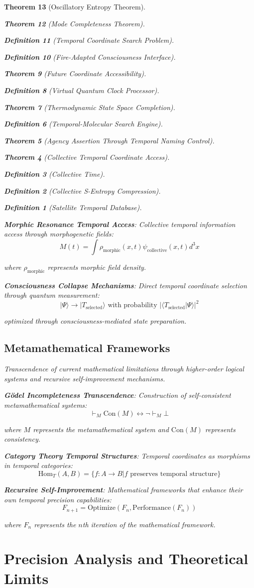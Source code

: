 \documentclass[12pt,a4paper]{article}
\newtheorem{theorem}{Theorem}[section]
\newtheorem{definition}[theorem]{Definition}
\begin{document}
\begin{theorem}[Oscillatory Entropy Theorem]
\begin{theorem}[Mode Completeness Theorem]
\begin{enumerate}
\begin{definition}[Temporal Coordinate Search Problem]
\begin{algorithm}
\begin{definition}[Fire-Adapted Consciousness Interface]
\begin{theorem}[Future Coordinate Accessibility]
\begin{definition}[Virtual Quantum Clock Processor]
\begin{itemize}
\begin{itemize}
\begin{theorem}[Thermodynamic State Space Completion]
\begin{definition}[Temporal-Molecular Search Engine]
\begin{theorem}[Agency Assertion Through Temporal Naming Control]
\begin{remark}
\begin{theorem}[Collective Temporal Coordinate Access]
\begin{definition}[Collective Time]
\begin{definition}[Collective S-Entropy Compression]
\begin{definition}[Satellite Temporal Database]
\begin{algorithm}
\begin{table}[h]
{{\textbf{Morphic Resonance Temporal Access}: Collective temporal information access through morphogenetic fields:
$$M(t) = \int \rho_{\text{morphic}}(x,t) \psi_{\text{collective}}(x,t) d^3x$$

where $\rho_{\text{morphic}}$ represents morphic field density.

\textbf{Consciousness Collapse Mechanisms}: Direct temporal coordinate selection through quantum measurement:
$$|\Psi\rangle \to |T_{\text{selected}}\rangle \text{ with probability } |\langle T_{\text{selected}}|\Psi\rangle|^2$$

optimized through consciousness-mediated state preparation.

\subsection{Metamathematical Frameworks}

Transcendence of current mathematical limitations through higher-order logical systems and recursive self-improvement mechanisms.

\textbf{Gödel Incompleteness Transcendence}: Construction of self-consistent metamathematical systems:
$$\vdash_M \text{Con}(M) \leftrightarrow \neg \vdash_M \bot$$

where $M$ represents the metamathematical system and $\text{Con}(M)$ represents consistency.

\textbf{Category Theory Temporal Structures}: Temporal coordinates as morphisms in temporal categories:
$$\text{Hom}_T(A,B) = \{f: A \to B | f \text{ preserves temporal structure}\}$$

\textbf{Recursive Self-Improvement}: Mathematical frameworks that enhance their own temporal precision capabilities:
$$F_{n+1} = \text{Optimize}(F_n, \text{Performance}(F_n))$$

where $F_n$ represents the $n$th iteration of the mathematical framework.

\section{Precision Analysis and Theoretical Limits}

}}
\end{table}
\end{algorithm}
\end{definition}
\end{definition}
\end{definition}
\end{theorem}
\end{remark}
\end{theorem}
\end{definition}
\end{theorem}
\end{itemize}
\end{itemize}
\end{definition}
\end{theorem}
\end{definition}
\end{algorithm}
\end{definition}
\end{enumerate}
\end{theorem}
\end{theorem}
\end{document}
